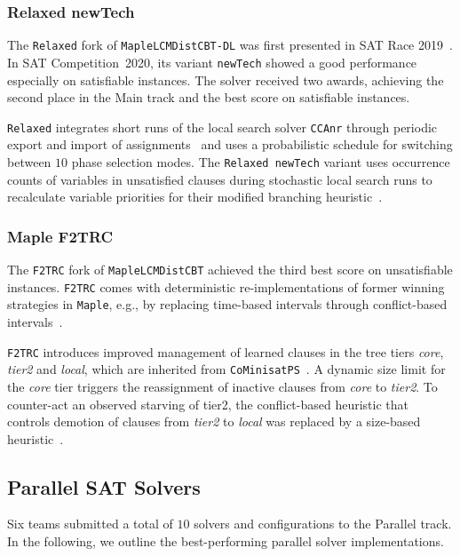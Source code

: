 \documentclass{elsarticle}
\newcommand{\solver}[1]{\texttt{#1}}
\begin{document}
\subsubsection{Relaxed newTech}

The \solver{Relaxed} fork of \solver{MapleLCMDistCBT-DL} was first presented in SAT Race 2019~\cite{Xindi:SC2019}. 
In SAT Competition~2020, its variant \solver{newTech} showed a good performance especially on satisfiable instances. 
The solver received two awards, achieving the second place in the Main track and the best score on satisfiable instances. 

\solver{Relaxed} integrates short runs of the local search solver \solver{CCAnr} through periodic export and import of assignments~\cite{Xindi:SC2019} and uses a probabilistic schedule for switching between $10$ phase selection modes. 
The \solver{Relaxed newTech} variant uses occurrence counts of variables in unsatisfied clauses during stochastic local search runs to recalculate variable priorities for their modified branching heuristic~\cite{Xindi:SC2020}. 


\subsubsection{Maple F2TRC}

The \solver{F2TRC} fork of \solver{MapleLCMDistCBT} achieved the third best score on unsatisfiable instances. 
\solver{F2TRC} comes with deterministic re-implementations of former winning strategies in \solver{Maple}, e.g., by replacing time-based intervals through conflict-based intervals~\cite{Kochemazov:SC2020}. 

\solver{F2TRC} introduces improved management of learned clauses in the tree tiers \emph{core}, \emph{tier2} and \emph{local}, which are inherited from \solver{CoMinisatPS}~\cite{Oh:2015:satunsat}.
A dynamic size limit for the \emph{core} tier triggers the reassignment of inactive clauses from \emph{core} to \emph{tier2}. 
To counter-act an observed starving of tier2, the conflict-based heuristic that controls demotion of clauses from \emph{tier2} to \emph{local} was replaced by a size-based heuristic~\cite{Kochemazov:SC2020}. 


\subsection{Parallel SAT Solvers}
\label{sec:part:par}

Six teams submitted a total of $10$ solvers and configurations to the Parallel track. 
In the following, we outline  the best-performing parallel solver implementations. 
\end{document}
